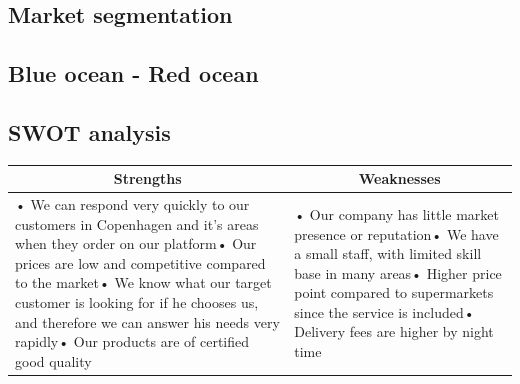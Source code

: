 \documentclass[12p]{article}
\begin{document}
\subsection{Market segmentation} \label{MarketSegmentation}

\newpage


\subsection{Blue ocean - Red ocean} \label{BlueOceanRedOcean}

\newpage


\subsection{SWOT analysis} \label{SWOT}

\begin{table}[htbp]
  \centering
    \begin{tabular}{|p{}|p{}|}
    \hline
    \multicolumn{1}{|c|}{\textbf{Strengths}} & \multicolumn{1}{c|}{\textbf{Weaknesses}} \\
    \hline
    {• We can respond very quickly to our customers in Copenhagen and it's areas when they order on our platform\newline{}• Our prices are low and competitive compared to the market\newline{}• We know what our target customer is looking for if he chooses us, and therefore we can answer his needs very rapidly\newline{}• Our products are of certified good quality} & • Our company has little market presence or reputation\newline{}• We have a small staff, with limited skill base in many areas\newline{}• Higher price point compared to supermarkets since the service is included\newline{}• Delivery fees are higher by night time \\
    \hline
    \end{tabular}
  \label{tab:addlabel}
\end{table}
\end{document}

